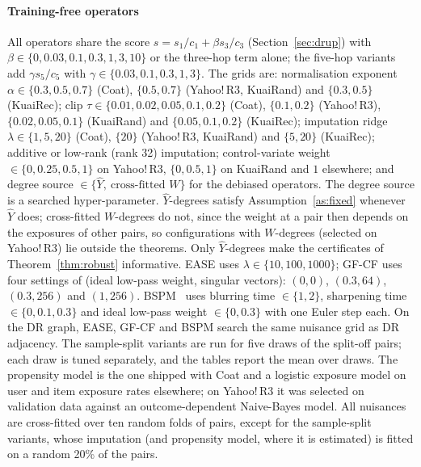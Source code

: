 \documentclass[preprint,review,12pt,authoryear]{elsarticle}
\theoremstyle{definition}
\begin{document}
\paragraph{Training-free operators}
All operators share the score $s=s_1/c_1+\beta s_3/c_3$ (Section~\ref{sec:drup}) with
$\beta\in\{0,0.03,0.1,0.3,1,3,10\}$ or the three-hop term alone; the five-hop
variants add $\gamma s_5/c_5$ with $\gamma\in\{0.03,0.1,0.3,1,3\}$. The grids are:
normalisation exponent $\alpha\in\{0.3,0.5,0.7\}$ (Coat), $\{0.5,0.7\}$
(Yahoo!\,R3, KuaiRand) and $\{0.3,0.5\}$ (KuaiRec); clip
$\tau\in\{0.01,0.02,0.05,0.1,0.2\}$ (Coat), $\{0.1,0.2\}$ (Yahoo!\,R3),
$\{0.02,0.05,0.1\}$ (KuaiRand) and $\{0.05,0.1,0.2\}$ (KuaiRec); imputation ridge
$\lambda\in\{1,5,20\}$ (Coat), $\{20\}$ (Yahoo!\,R3, KuaiRand) and $\{5,20\}$
(KuaiRec); additive or low-rank (rank 32) imputation; control-variate weight
$\in\{0,0.25,0.5,1\}$ on Yahoo!\,R3, $\{0,0.5,1\}$ on KuaiRand and $1$ elsewhere; and degree source $\in\{\hat Y,\ \text{cross-fitted }W\}$ for
the debiased operators. The degree source is a searched hyper-parameter.
$\hat Y$-degrees satisfy Assumption~\ref{as:fixed} whenever $\hat Y$ does;
cross-fitted $W$-degrees do not, since the weight at a pair then depends on
the exposures of other pairs, so configurations with $W$-degrees (selected on
Yahoo!\,R3) lie outside the theorems. Only $\hat Y$-degrees make the
certificates of Theorem~\ref{thm:robust} informative. EASE uses
$\lambda\in\{10,100,1000\}$; GF-CF uses four settings of (ideal low-pass weight, singular vectors):
$(0,0)$, $(0.3,64)$, $(0.3,256)$ and $(1,256)$. BSPM~\citep{choi2023bspm} uses blurring time
$\in\{1,2\}$, sharpening time $\in\{0,0.1,0.3\}$ and ideal low-pass weight
$\in\{0,0.3\}$ with one Euler step each. On the DR graph, EASE, GF-CF and BSPM
search the same nuisance grid as DR adjacency. The sample-split variants are
run for five draws of the split-off pairs; each draw is tuned separately, and
the tables report the mean over draws. The propensity model is
the one shipped with Coat and a logistic exposure model on user and item
exposure rates elsewhere; on Yahoo!\,R3 it was selected on validation data
against an outcome-dependent Naive-Bayes model. All nuisances are cross-fitted
over ten random folds of pairs, except for the sample-split variants, whose
imputation (and propensity model, where it is estimated) is fitted on a random
20\% of the pairs.
\end{document}
